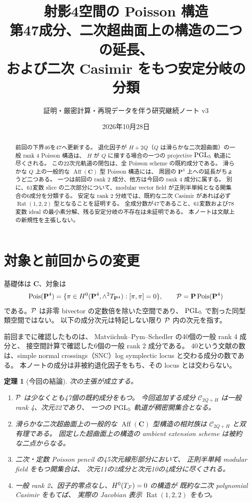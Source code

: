 \documentclass[11pt,a4paper]{ltjsarticle}
\title{射影4空間の Poisson 構造\\[3mm]\large 第47成分、二次超曲面上の構造の二つの延長、\\および二次 Casimir をもつ安定分岐の分類}
\author{証明・厳密計算・再現データを伴う研究継続ノート v3}
\date{2026年10月28日}
\newcommand{\PP}{\mathbf P}\renewcommand{\AA}{\mathbf A}\newcommand{\CC}{\mathbf C}\newcommand{\QQ}{\mathbf Q}
\DeclareMathOperator{\Pois}{Pois}\DeclareMathOperator{\rank}{rank}\DeclareMathOperator{\Spec}{Spec}
\DeclareMathOperator{\Rat}{Rat}\DeclareMathOperator{\Aff}{Aff}\DeclareMathOperator{\Aut}{Aut}
\newtheorem{theorem}{定理}[section]\newtheorem{proposition}[theorem]{命題}\newtheorem{lemma}[theorem]{補題}\newtheorem{corollary}[theorem]{系}
\theoremstyle{remark}\newtheorem{remark}[theorem]{注意}\renewcommand{\proofname}{証明}
\begin{document}
\maketitle
\begin{abstract}
前回の下界46を47へ更新する。
退化因子が $H+2Q$（$Q$ は滑らかな二次超曲面）の一般 rank 4 Poisson 構造は、
$H$ が $Q$ に接する場合の一つの projective $\operatorname{PGL}_5$ 軌道に尽くされる。
この22次元軌道の閉包は、全 Poisson scheme の既約成分である。
滑らかな $Q$ 上の一般的な $\Aff(\CC)$ 型 Poisson 構造には、
周囲の $\PP^4$ 上への延長がちょうど二つある。
一つは前回の rank 2 成分、他方は今回の rank 4 成分に属する。
別に、61変数 slice の二次部分について、modular vector field が正則半単純となる開集合の6成分を分類する。
安定な rank 2 分岐では、既約な二次 Casimir があれば必ず $\Rat(1,2,2)$ 型となることを証明する。
全成分数が47であること、61変数および78変数 ideal の最小素分解、残る安定分岐の不存在は未証明である。
本ノートは文献上の新規性を主張しない。
\end{abstract}
\tableofcontents

\section{対象と前回からの変更}
基礎体は $\CC$、対象は
\[
 \Pois(\PP^4)=
 \{\pi\in H^0(\PP^4,\wedge^2T_{\PP^4}):[\pi,\pi]=0\},
 \qquad \cP=\PP\Pois(\PP^4)
\]
である。$\mathcal P$ は非零 bivector の定数倍を除いた空間であり、
$\operatorname{PGL}_5$ で割った同型類空間ではない。
以下の成分次元は特記しない限り $\mathcal P$ 内の次元を指す。

前回までに確認したものは、
Matviichuk--Pym--Schedler \cite[Theorem 1.4]{MPS} の40個の一般 rank 4 成分と、
接空間計算で確認した6個の一般 rank 2 成分である。
40という文献の数は、simple normal crossings（SNC）log symplectic locus と交わる成分の数である。
本ノートの成分は非被約退化因子をもち、その locus とは交わらない。

\begin{theorem}[今回の結論]\label{thm:overview}
次の主張が成立する。
\begin{enumerate}
 \item $\mathcal P$ は少なくとも47個の既約成分をもつ。
 今回追加する成分 $\mathcal C_{2Q+H}$ は一般 rank 4、次元22であり、
 一つの $\operatorname{PGL}_5$ 軌道が稠密開集合となる。
 \item 滑らかな二次超曲面上の一般的な $\Aff(\CC)$ 型構造の相対族は
 $\mathcal C_{2Q+H}$ と双有理である。
 固定した超曲面上の構造の ambient extension scheme は被約な二点からなる。
 \item 二次・定数 Poisson pencil の45次元線形部分において、
 正則半単純 modular field をもつ開集合は、
 次元11の2成分と次元10の4成分に尽くされる。
 \item 一般 rank 2、因子的零点なし、$H^0(T_\mathcal F)=0$ の構造が
 既約な二次 polynomial Casimir をもてば、
 実際の Jacobian 表示 $\Rat(1,2,2)$ をもつ。
\end{enumerate}
\end{theorem}
\end{document}
